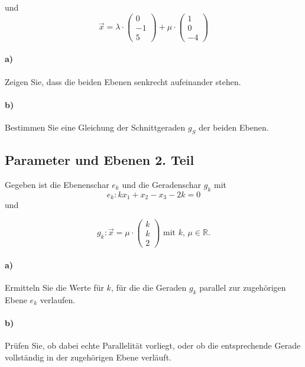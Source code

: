 \documentclass{ajc}
\numberwithin{equation}{subsection}
\begin{document}
	und
	\begin{equation}
		\overrightarrow{x}=\lambda \cdot \left(\begin{array}{r} 0 \\ -1 \\ 5\end{array}\right) + \mu \cdot \left(\begin{array}{r} 1 \\ 0 \\ -4\end{array}\right)
	\end{equation}
	
	\paragraph{a)} Zeigen Sie, dass die beiden Ebenen senkrecht aufeinander stehen.
	
	
	
	
	\paragraph{b)} Bestimmen Sie eine Gleichung der Schnittgeraden $g_S$ der beiden Ebenen.
	
	
	
	
	
	
	
	
	\subsection{Parameter und Ebenen 2. Teil}
	Gegeben ist die Ebenenschar $e_k$ und die Geradenschar $g_k$ mit
	\begin{equation}
		e_k: kx_1 + x_2 - x_3 - 2k = 0
	\end{equation}
	und 
	
	\begin{equation}
		g_k: \vec{x} = \mu \cdot \left(\begin{array}{r} k \\ k \\ 2\end{array}\right) \text{ mit } k,\,\mu \in \mathbb{R}.
	\end{equation}
	
	\paragraph{a)} Ermitteln Sie die Werte für $k$, für die die Geraden $g_k$ parallel zur zugehörigen Ebene $e_k$ verlaufen.
	
	\paragraph{b)} Prüfen Sie, ob dabei echte Parallelität vorliegt, oder ob die entsprechende Gerade vollständig in der zugehörigen Ebene verläuft. 
	
	
	
	
	
	
	
\end{document}
